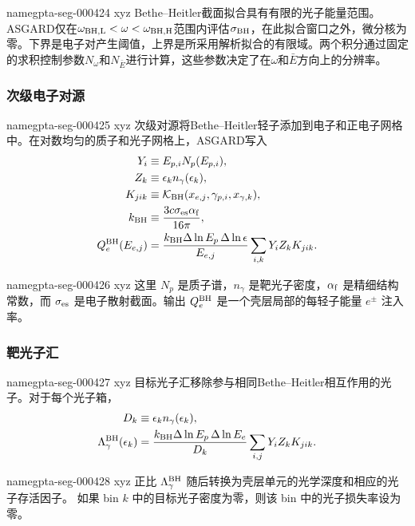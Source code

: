 \documentclass[twocolumn]{aastex702}
\makeatletter
\providecommand{\gptareaderanchor}[1]{\pdfdest name{#1} xyz}%
\providecommand{\gptareaderanchor}[1]{\special{pdf:dest (#1) [ @thispage /XYZ @xpos @ypos null ]}}%
\makeatother
\begin{document}
\gptareaderanchor{gpta-seg-000424}%
Bethe–Heitler截面拟合具有有限的光子能量范围。ASGARD仅在\(\omega_{\rm BH,L}<\omega<\omega_{\rm BH,H}\)范围内评估\(\sigma_{\rm BH}\)，在此拟合窗口之外，微分核为零。下界是电子对产生阈值，上界是所采用解析拟合的有限域。两个积分通过固定的求积控制参数\(N_\omega\)和\(N_{\bar E}\)进行计算，这些参数决定了在\(\omega\)和\(\bar E\)方向上的分辨率。

\subsubsection{次级电子对源}


\gptareaderanchor{gpta-seg-000425}%
次级对源将Bethe--Heitler轻子添加到电子和正电子网格中。在对数均匀的质子和光子网格上，ASGARD写入
\begin{equation}
\begin{aligned}
Y_i&\equiv E_{p,i}N_p(E_{p,i}),\\
Z_k&\equiv \epsilon_k n_\gamma(\epsilon_k),\\
K_{jik}&\equiv
\mathcal{K}_{\rm BH}(x_{e,j},\gamma_{p,i},x_{\gamma,k}),\\
k_{\rm BH}&\equiv \frac{3c\sigma_{\rm es}\alpha_{\rm f}}{16\pi},\\
Q_e^{\rm BH}(E_{e,j})
&=\frac{k_{\rm BH}\Delta\ln E_p\,\Delta\ln\epsilon}{E_{e,j}}
\sum_{i,k}Y_iZ_kK_{jik}.
\end{aligned}
\end{equation}

\gptareaderanchor{gpta-seg-000426}%
这里 \(N_p\) 是质子谱，\(n_\gamma\) 是靶光子密度，\(\alpha_{\rm f}\) 是精细结构常数，而 \(\sigma_{\rm es}\) 是电子散射截面。输出 \(Q_e^{\rm BH}\) 是一个壳层局部的每轻子能量 \(e^\pm\) 注入率。

\subsubsection{靶光子汇}


\gptareaderanchor{gpta-seg-000427}%
目标光子汇移除参与相同Bethe--Heitler相互作用的光子。对于每个光子箱，
\begin{equation}
\begin{aligned}
D_k&\equiv \epsilon_k n_\gamma(\epsilon_k),\\
\Lambda_{\gamma}^{\rm BH}(\epsilon_k)
&=\frac{k_{\rm BH}\Delta\ln E_p\,\Delta\ln E_e}{D_k}
\sum_{i,j}Y_iZ_kK_{jik}.
\end{aligned}
\end{equation}

\gptareaderanchor{gpta-seg-000428}%
正比 \(\Lambda_{\gamma}^{\rm BH}\) 随后转换为壳层单元的光学深度和相应的光子存活因子。
如果 bin \(k\) 中的目标光子密度为零，则该 bin 中的光子损失率设为零。
\end{document}
